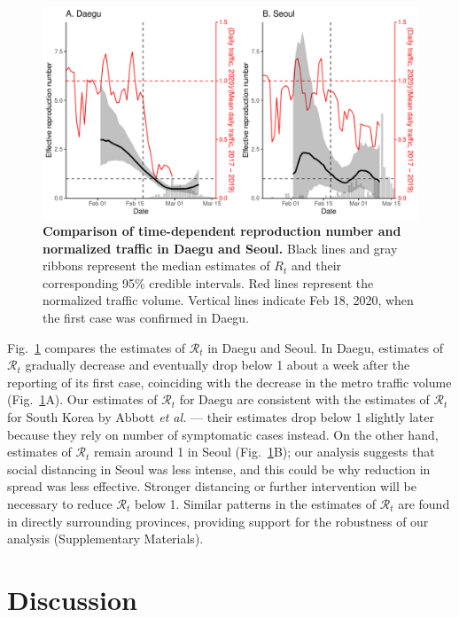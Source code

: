 \documentclass[12pt]{article}
\newcommand{\fref}[1]{Fig.~\ref{fig:#1}}
\begin{document}
\begin{figure}[!ht]
\includegraphics[width=\textwidth]{figure_compare_R_t.pdf}
\caption{
\textbf{Comparison of time-dependent reproduction number and normalized traffic in Daegu and Seoul.}
Black lines and gray ribbons represent the median estimates of $R_t$ and their corresponding 95\% credible intervals.
Red lines represent the normalized traffic volume.
Vertical lines indicate Feb 18, 2020, when the first case was confirmed in Daegu.
}
\label{fig:eff}
\end{figure}

\fref{eff} compares the estimates of $\mathcal R_t$ in Daegu and Seoul.
In Daegu, estimates of $\mathcal R_t$ gradually decrease and eventually drop below 1 about a week after the reporting of its first case, coinciding with the decrease in the metro traffic volume (\fref{eff}A).
Our estimates of $\mathcal R_t$ for Daegu are consistent with the estimates of $\mathcal R_t$ for South Korea by Abbott \textit{et al.} \cite{tempvar} --- their estimates drop below 1 slightly later because they rely on number of symptomatic cases instead.
On the other hand, estimates of $\mathcal R_t$ remain around 1 in Seoul (\fref{eff}B);
our analysis suggests that social distancing in Seoul was less intense, and this could be why reduction in spread was less effective.
Stronger distancing or further intervention will be necessary to reduce $\mathcal R_t$ below 1.
Similar patterns in the estimates of $\mathcal R_t$ are found in directly surrounding provinces, providing support for the robustness of our analysis (Supplementary Materials).

\section{Discussion}
\end{document}
